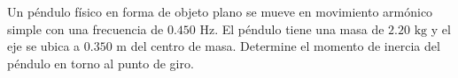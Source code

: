 \item Un péndulo físico en forma de objeto plano se mueve en movimiento armónico simple con una frecuencia de $0.450\text{ Hz}$. El péndulo tiene una masa de $2.20\text{ kg}$ y el eje se ubica a $0.350\text{ m}$ del centro de masa. Determine el momento de inercia del péndulo en torno al punto de giro.